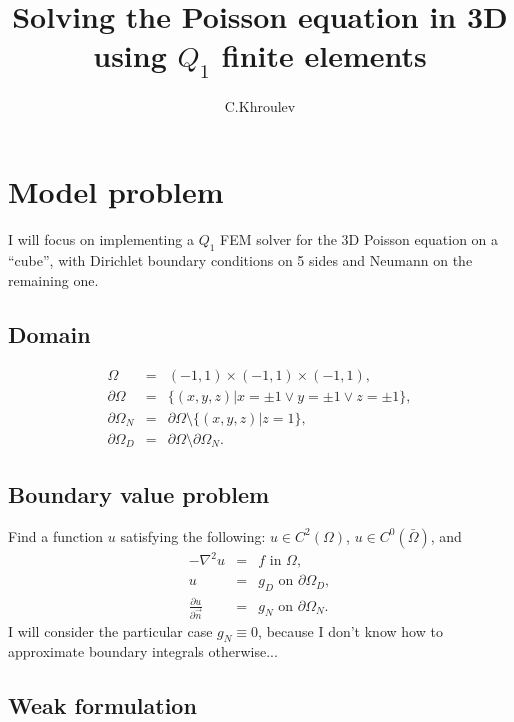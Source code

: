 \documentclass{article}
\begin{document}
\title{Solving the Poisson equation in 3D using $Q_{1}$ finite elements}
\author{C.Khroulev}
\maketitle

{\tableofcontents}

\section{Model problem}

I will focus on implementing a $Q_1$ FEM solver for the 3D Poisson equation on
a ``cube'', with Dirichlet boundary conditions on 5 sides and Neumann on the
remaining one.

\subsection{Domain}

\begin{eqnarray*}
  \Omega & = & (- 1, 1) \times (- 1, 1) \times (- 1, 1),\\
  \partial \Omega & = & \{ (x, y, z) | x = \pm 1 \vee y = \pm 1 \vee z = \pm
  1 \},\\
  \partial \Omega_N & = & \partial \Omega \setminus \{ (x, y, z) |z = 1 \},\\
  \partial \Omega_D & = & \partial \Omega \setminus \partial \Omega_N .
\end{eqnarray*}

\subsection{Boundary value problem}

Find a function $u$ satisfying the following: $u \in C^2 (\Omega)$, $u \in
C^0 (\bar{\Omega})$, and
\begin{eqnarray}
  - \nabla^2 u & = & f \text{ in } \Omega,  \label{eq:poisson}\\
  u & = & g_D  \text{ on } \partial \Omega_D, \nonumber\\
  \frac{\partial u}{\partial \vec{n}} & = & g_N  \text{ on } \partial \Omega_N
  . \nonumber
\end{eqnarray}
I will consider the particular case $g_N \equiv 0$, because I don't know how
to approximate boundary integrals otherwise...

\subsection{Weak formulation}
\end{document}
